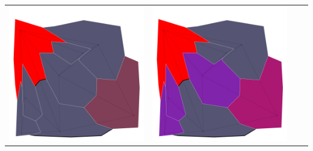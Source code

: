 \documentclass[10pt,a4paper]{article}
\begin{document}
\begin{tabular}{c c c c }
	\includegraphics[scale=.10]{../results/backtracking_forward/map_build/bt_forward_I00003.pdf}&
	\includegraphics[scale=.10]{../results/backtracking_forward/map_build/bt_forward_I00004.pdf}\\
	

\end{tabular}
\end{document}

